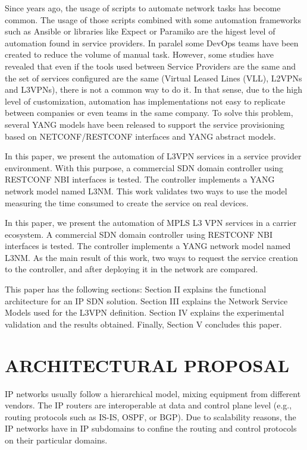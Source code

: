 \documentclass[conference]{IEEEtran}
\begin{document}
Since years ago, the usage of scripts to automate network tasks has become common. The usage of those scripts combined with some automation frameworks such as Ansible \cite{} or libraries like Expect \cite{} or Paramiko \cite{} are the higest level of automation found in service providers. In paralel some DevOps teams have been created to reduce the volume of manual task. However, some studies have revealed that even if the tools used between Service Providers are the same and the set of services configured are the same (Virtual Leased Lines (VLL), L2VPNs and L3VPNs), there is not a common way to do it. In that sense, due to the high level of customization, automation has implementations not easy to replicate between companies or even teams in the same company. To solve this problem, several YANG models have been released to support the service provisioning based on NETCONF/RESTCONF \cite{} interfaces and YANG \cite{} abstract models. 

In this paper, we present the automation of L3VPN services in a service provider environment. With this purpose, a commercial SDN domain controller using RESTCONF NBI interfaces is tested. The controller implements a YANG network model named L3NM. This work validates two ways to use the model measuring the time consumed to create the service on real devices. 

In this paper, we present the automation of MPLS L3 VPN services in a carrier ecosystem. A commercial SDN domain controller using RESTCONF NBI interfaces is tested. The controller implements a YANG network model named L3NM.  As the main result of this work, two ways to request the service creation to the controller, and after deploying it in the network are compared.

This paper has the following sections: Section II explains the functional architecture for an IP SDN solution. Section III explains the Network Service Models used for the L3VPN definition. Section IV  explains the experimental validation and the results obtained. Finally, Section V concludes this paper. 

\section{ARCHITECTURAL PROPOSAL}

IP networks usually follow a hierarchical model, mixing equipment from different vendors. The IP routers are interoperable at data and control plane level (e.g., routing protocols such as IS-IS, OSPF, or BGP). Due to scalability reasons, the IP networks have in IP subdomains to confine the routing and control protocols on their particular domains.
\end{document}
